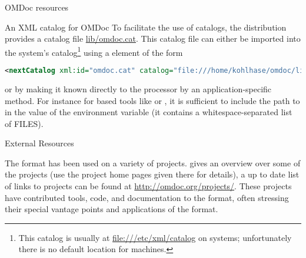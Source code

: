 \begin{tchapter}[id=resources]{OMDoc resources}
\begin{tsection}[id=catalog]{An XML catalog for OMDoc}
To facilitate the use of catalogs, the {\omdoc} distribution provides a catalog file
\url{lib/omdoc.cat}. This catalog file can either be imported into the system's
catalog\footnote{This catalog is usually at \url{file:///etc/xml/catalog} on {\unix}
  systems; unfortunately there is no default location for {\windows} machines.} using a
{} element of the form
\begin{lstlisting}[language=XML]
<nextCatalog xml:id="omdoc.cat" catalog="file:///home/kohlhase/omdoc/lib/omdoc.cat"/>
\end{lstlisting}
or by making it known directly to the {\xml} processor by an
application-specific method. For instance for {} based tools like
{} or {}, it is sufficient to include the path to
{} in the value of the {} environment
variable (it contains a whitespace-separated list of FILES).
\end{tsection}

\begin{tsection}[id=external-resources]{External Resources}

The {\omdoc} format has been used on a variety of projects. {}
gives an overview over some of the projects (use the project home pages given
there for details), a up to date list of links to {\omdoc} projects can be found
at \url{http://omdoc.org/projects/}. These projects have
contributed tools, code, and documentation to the {\omdoc} format, often stressing
their special vantage points and applications of the format.
\end{tsection}
\end{tchapter}

